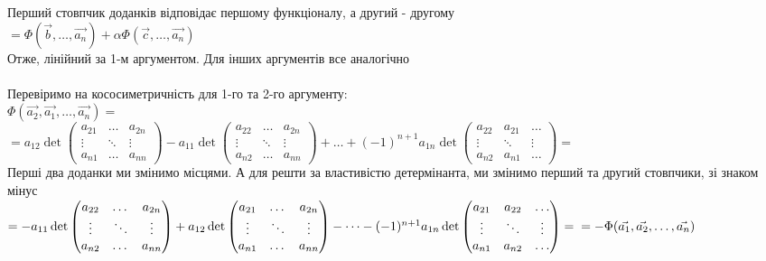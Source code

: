 \documentclass[a4paper, 14pt]{extarticle}
\begin{document}
Перший стовпчик доданків відповідає першому функціоналу, а другий - другому\\
$= \Phi(\vec{b}, \dots, \vec{a_n}) + \alpha \Phi(\vec{c},\dots, \vec{a_n})$\\
Отже, лінійний за 1-м аргументом. Для інших аргументів все аналогічно\\
\\
Перевіримо на кососиметричність для 1-го та 2-го аргументу:\\
$\Phi(\vec{a_2},\vec{a_1},\dots,\vec{a_n}) = $\\
\hspace*{-2cm}
$= a_{12} \det \begin{pmatrix} a_{21} & \dots & a_{2n} \\ \vdots & \ddots & \vdots \\ a_{n1} & \dots & a_{nn} \end{pmatrix} - a_{11} \det \begin{pmatrix} a_{22} & \dots & a_{2n} \\ \vdots & \ddots & \vdots \\ a_{n2} & \dots & a_{nn} \end{pmatrix} + \dots + (-1)^{n+1} a_{1n} \det \begin{pmatrix} a_{22} & a_{21} & \dots \\ \vdots & \ddots & \vdots \\ a_{n2} & a_{n1} & \dots \end{pmatrix} = $\\
Перші два доданки ми змінимо місцями. А для решти за властивістю детермінанта, ми змінимо перший та другий стовпчики, зі знаком мінус\\
\hspace*{-2cm}
$= - a_{11} \det \begin{pmatrix} a_{22} & \dots & a_{2n} \\ \vdots & \ddots & \vdots \\ a_{n2} & \dots & a_{nn} \end{pmatrix} + a_{12} \det \begin{pmatrix} a_{21} & \dots & a_{2n} \\ \vdots & \ddots & \vdots \\ a_{n1} & \dots & a_{nn} \end{pmatrix} - \dots - (-1)^{n+1} a_{1n} \det \begin{pmatrix} a_{21} & a_{22} & \dots \\ \vdots & \ddots & \vdots \\ a_{n1} & a_{n2} & \dots \end{pmatrix} = \\ = -\Phi(\vec{a_1},\vec{a_2},\dots,\vec{a_n})$\\
\end{document}
